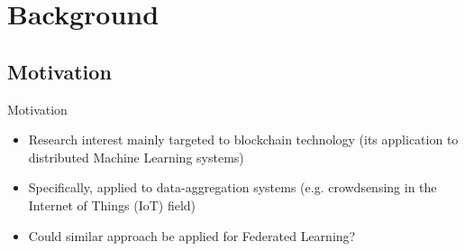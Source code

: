 

\section{Background}

\subsection{Motivation}

\begin{frame}{Motivation}
  \begin{itemize}
    \item Research interest mainly targeted to \alert{blockchain technology} (its application to distributed Machine Learning systems)
	\item Specifically, applied to data-aggregation systems (e.g. \alert{crowdsensing} in the Internet of Things (IoT) field)
	\item Could similar approach be applied for \alert{Federated Learning}?
  \end{itemize}
\end{frame}

